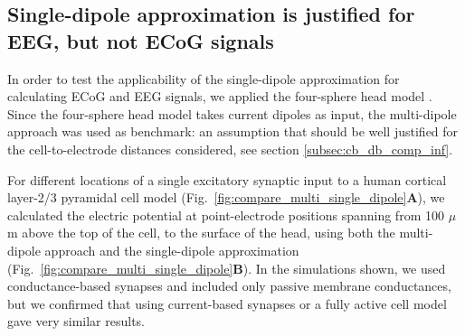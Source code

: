 \documentclass[preprint,10pt,authoryear]{elsarticle}
\begin{document}
\subsection{Single-dipole approximation is justified for EEG, but not ECoG signals}\label{subsec:cb_db_comp_4s}

In order to test the applicability of the single-dipole approximation for calculating ECoG and EEG signals, we applied the four-sphere head model \citep{NAESS2017, HAGEN2018, HAGEN2019}.
Since the four-sphere head model takes current dipoles as input, the multi-dipole approach was used as benchmark: an assumption that should be well justified for the cell-to-electrode distances considered, see section \ref{subsec:cb_db_comp_inf}.

For different locations of a single excitatory synaptic input to a human cortical layer-2/3 pyramidal cell model \citep{EYAL2016}
(Fig.~\ref{fig:compare_multi_single_dipole}\textbf{A}), we calculated the electric potential at point-electrode positions spanning from 100 $\mu$m above the top of the cell, to the surface of the head, using both the multi-dipole approach and the single-dipole approximation (Fig.~\ref{fig:compare_multi_single_dipole}\textbf{B}). 
In the simulations shown, we used conductance-based synapses and included only passive membrane conductances, but we confirmed that using current-based synapses or a fully active cell model gave very similar results.  
\end{document}
